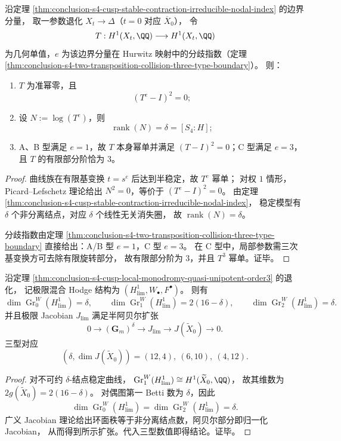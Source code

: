 \begin{theorem}\label{thm:conclusion-s4-cusp-local-monodromy-quasi-unipotent-order3}
沿定理 \ref{thm:conclusion-s4-cusp-stable-contraction-irreducible-nodal-index} 的边界分量，
取一参数退化 \(X_t\to\Delta\)（\(t=0\) 对应 \(\overline X_0\)），
令
\[
T:H^1(X_t,\QQ)\longrightarrow H^1(X_t,\QQ)
\]
为几何单值，\(e\) 为该边界分量在 Hurwitz 映射中的分歧指数（定理
\ref{thm:conclusion-s4-two-transposition-collision-three-type-boundary}）。
则：
\begin{enumerate}
  \item \(T\) 为准幂零，且
  \[
  (T^e-I)^2=0;
  \]
  \item 设 \(N:=\log(T^e)\)，则
  \[
  \operatorname{rank}(N)=\delta=[S_4:H];
  \]
  \item A、B 型满足 \(e=1\)，故 \(T\) 本身幂单并满足 \((T-I)^2=0\)；C 型满足 \(e=3\)，且 \(T\) 的有限部分阶恰为 \(3\)。
\end{enumerate}
\end{theorem}
\begin{proof}
曲线族在有限基变换 \(t=s^e\) 后达到半稳定，故 \(T^e\) 幂单；
对权 \(1\) 情形，Picard--Lefschetz 理论给出
\(
N^2=0
\)，等价于 \((T^e-I)^2=0\)。
由定理 \ref{thm:conclusion-s4-cusp-stable-contraction-irreducible-nodal-index}，
稳定模型有 \(\delta\) 个非分离结点，对应 \(\delta\) 个线性无关消失圈，
故 \(\operatorname{rank}(N)=\delta\)。

分歧指数由定理
\ref{thm:conclusion-s4-two-transposition-collision-three-type-boundary}
直接给出：A/B 型 \(e=1\)，C 型 \(e=3\)。
在 C 型中，局部参数需三次基变换方可去除有限旋转部分，
故有限部分阶为 \(3\)，并且 \(T^3\) 幂单。证毕。
\end{proof}

\begin{theorem}\label{thm:conclusion-s4-cusp-lmhs-weight-jacobian-semiabelian}
沿定理 \ref{thm:conclusion-s4-cusp-local-monodromy-quasi-unipotent-order3} 的退化，
记极限混合 Hodge 结构为
\(
(H^1_{\lim},W_\bullet,F^\bullet)
\)。
则有
\[
\dim \operatorname{Gr}^W_0(H^1_{\lim})=\delta,\qquad
\dim \operatorname{Gr}^W_1(H^1_{\lim})=2(16-\delta),\qquad
\dim \operatorname{Gr}^W_2(H^1_{\lim})=\delta.
\]
并且极限 Jacobian \(J_{\lim}\) 满足半阿贝尔扩张
\[
0\longrightarrow (\mathbf G_m)^\delta
\longrightarrow J_{\lim}
\longrightarrow J(\widetilde X_0)
\longrightarrow 0.
\]
三型对应
\[
(\delta,\dim J(\widetilde X_0))=(12,4),\ (6,10),\ (4,12).
\]
\end{theorem}
\begin{proof}
对不可约 \(\delta\)-结点稳定曲线，
\(\operatorname{Gr}^W_1(H^1_{\lim})\cong H^1(\widetilde X_0,\QQ)\)，
故其维数为 \(2g(\widetilde X_0)=2(16-\delta)\)。
对偶图第一 Betti 数为 \(\delta\)，因此
\[
\dim \operatorname{Gr}^W_0(H^1_{\lim})
=\dim \operatorname{Gr}^W_2(H^1_{\lim})
=\delta.
\]
广义 Jacobian 理论给出环面秩等于非分离结点数，阿贝尔部分即归一化 Jacobian，
从而得到所示扩张。代入三型数值即得结论。证毕。
\end{proof}

